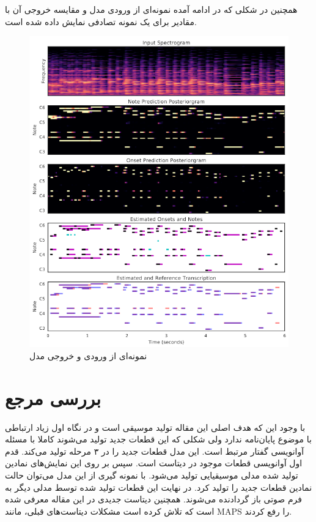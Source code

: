 همچنین در شکلی که در ادامه آمده نمونه‌ای از ورودی مدل و مقایسه خروجی آن با مقادیر
برای یک نمونه تصادفی نمایش داده شده است.

\begin{figure}
    \includegraphics[width=\linewidth]
    {./statics/hawthorne2017onsets_spectorgrams.png}
    \caption{نمونه‌ای از ورودی و خروجی مدل \cite{hawthorne2017onsets}}
\end{figure}

\section{بررسی مرجع \cite{hawthorne2018enabling}}
با وجود این که هدف اصلی این مقاله تولید موسیقی است و در نگاه اول زیاد ارتباطی
با موضوع پایان‌نامه ندارد ولی شکلی که این قطعات جدید تولید می‌شوند کاملا با مسئله
آوانویسی گفتار مرتبط است. این مدل قطعات جدید را در ۳ مرحله تولید می‌کند. قدم اول
آوانویسی قطعات موجود در دیتاست است. سپس بر روی این نمایش‌های نمادین تولید شده
مدلی موسیقیایی تولید می‌شود. با نمونه گیری از این مدل می‌توان حالت نمادین قطعات
جدید را تولید کرد. در نهایت این قطعات تولید شده توسط مدلی دیگر به فرم صوتی باز
گردادنده می‌شوند. همچنین دیتاست جدیدی در این مقاله معرفی شده است که تلاش کرده است
مشکلات دیتاست‌های قبلی، مانند
MAPS
را رفع کردند.

